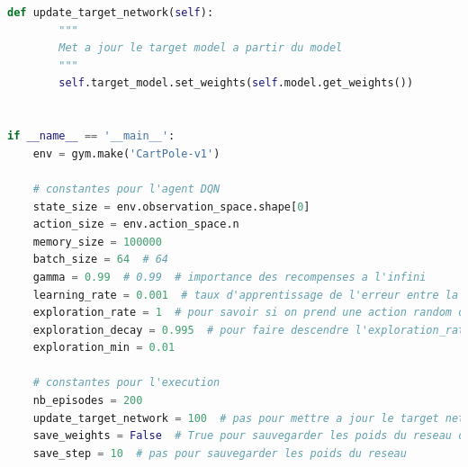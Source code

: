 \documentclass[10pt,a4paper]{article}
\begin{document}
\begin{lstlisting}[language=Python, caption=Programme principal de l'agent utilisant l'expérience replay]
    def update_target_network(self):
        """
        Met a jour le target model a partir du model
        """
        self.target_model.set_weights(self.model.get_weights())


if __name__ == '__main__':
    env = gym.make('CartPole-v1')

    # constantes pour l'agent DQN
    state_size = env.observation_space.shape[0]
    action_size = env.action_space.n
    memory_size = 100000
    batch_size = 64  # 64
    gamma = 0.99  # 0.99  # importance des recompenses a l'infini
    learning_rate = 0.001  # taux d'apprentissage de l'erreur entre la cible et la prediction
    exploration_rate = 1  # pour savoir si on prend une action random ou la meilleure action
    exploration_decay = 0.995  # pour faire descendre l'exploration_rate pour baisser le nombre d'explorations au fur et a mesure que l'agent apprend et devient meilleur
    exploration_min = 0.01

    # constantes pour l'execution
    nb_episodes = 200
    update_target_network = 100  # pas pour mettre a jour le target network
    save_weights = False  # True pour sauvegarder les poids du reseau dans un fichier tous les save_step episodes
    save_step = 10  # pas pour sauvegarder les poids du reseau


\end{lstlisting}
\end{document}
